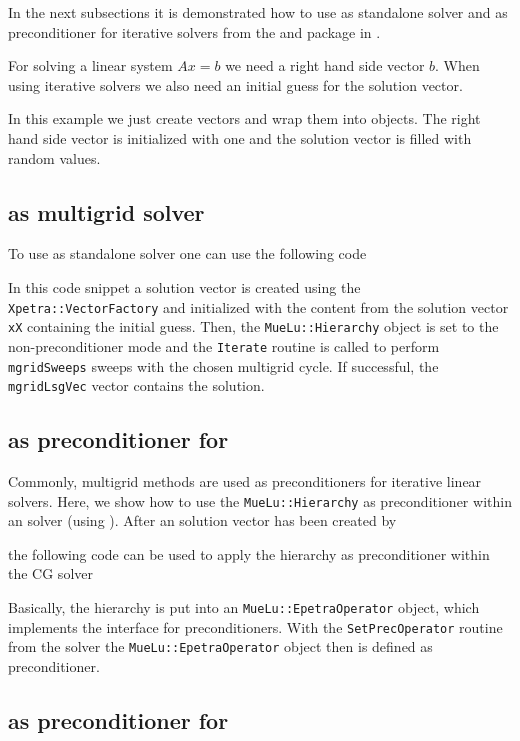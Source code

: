 \documentclass[10pt,fleqn]{book}
\providecommand\printCppListing[1]{

}
\begin{document}
In the next subsections it is demonstrated how to use \muelu as standalone solver and as preconditioner for iterative solvers from the \belos and \aztecoo package in \trilinos.

For solving a linear system $Ax=b$ we need a right hand side vector $b$. When using iterative solvers we also need an initial guess for the solution vector.
\printCppListing{laplace2d.cpp_7.fragment}
In this example we just create \epetra vectors and wrap them into \xpetra objects. The right hand side vector is initialized with one and the solution vector is filled with random values.

\subsection{\muelu as multigrid solver}
To use \muelu as standalone solver one can use the following code
\printCppListing{laplace2d.cpp_18.fragment}
In this code snippet a solution vector is created using the \texttt{Xpetra::VectorFactory} and initialized with the content from the solution vector \verb|xX| containing the initial guess. Then, the \texttt{MueLu::Hierarchy} object is set to the non-preconditioner mode and the \texttt{Iterate} routine is called
to perform \texttt{mgridSweeps} sweeps with the chosen multigrid cycle. If successful, the \texttt{mgridLsgVec} vector contains the solution.

\subsection{\muelu as preconditioner for \aztecoo}
Commonly, multigrid methods are used as preconditioners for iterative linear solvers. Here, we show how to use the \texttt{MueLu::Hierarchy} as preconditioner within an \aztecoo solver (using \epetra).
After an \epetra solution vector has been created by

the following code can be used to apply the \muelu hierarchy as preconditioner within the \aztecoo CG solver

Basically, the \muelu hierarchy is put into an \texttt{MueLu::EpetraOperator} object, which implements the \epetra interface for preconditioners.
With the \texttt{SetPrecOperator} routine from the \aztecoo solver the \texttt{MueLu::EpetraOperator} object then is defined as preconditioner.

\subsection{\muelu as preconditioner for \belos}
\label{sec:muelu_belospreconditioner}
\end{document}
